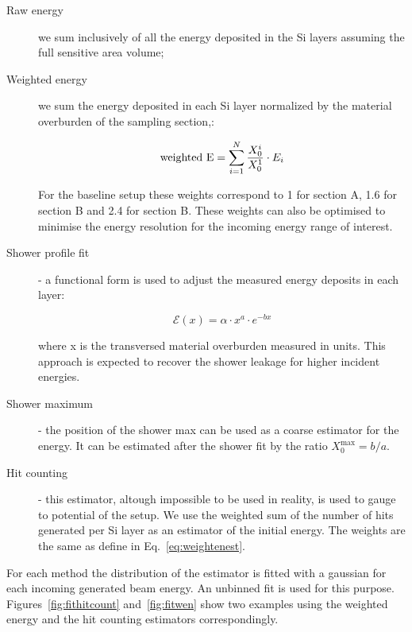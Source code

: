 \begin{description}

\item[Raw energy] we sum inclusively of all the energy deposited in
  the Si layers assuming the full sensitive area volume;

\item[Weighted energy] we sum the energy deposited in each Si layer
  normalized by the material overburden of the sampling section,\ie:

\begin{equation}
{\rm weighted~E}=\sum_{i=1}^{N} \frac{X_0^i}{X_0^1}\cdot E_i
\label{eq:weightenest}
\end{equation}

For the baseline setup these weights correspond to 1 for section A,
1.6 for section B and 2.4 for section B.
These weights can also be optimised to minimise the energy resolution
for the incoming energy range of interest.

\item[Shower profile fit] - a functional form is used to adjust the
  measured energy deposits in each layer:

\begin{equation}
\mathcal{E}(x)=\alpha\cdot x^{a} \cdot e^{-bx} 
\label{eq:showerprof}
\end{equation}

where x is the transversed material overburden measured in \Xnot
units. This approach is expected to recover the shower leakage for
higher incident energies.

\item[Shower maximum] - the position of the shower max can be used as a
  coarse estimator for the energy. It can be estimated after the
  shower fit by the ratio $X_{0}^{\max}=b/a$.

\item[Hit counting] - this estimator, altough impossible to be used in
  reality, is used to gauge to potential of the setup. We use the
  weighted sum  of the number of hits generated per Si layer as an
  estimator of the initial energy. The weights are the same as define
  in Eq.~\ref{eq:weightenest}.

\end{description}

For each method the distribution of the estimator is fitted with a
gaussian for each incoming generated beam energy. An unbinned fit is
used for this purpose. Figures~\ref{fig:fithitcount}
and~\ref{fig:fitwen}
show two examples using the weighted energy and the hit counting
estimators correspondingly.

